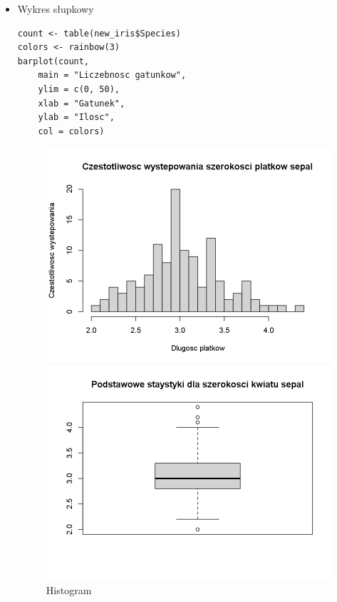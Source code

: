 \documentclass[11pt]{article}
\begin{document}
\begin{enumerate}
\begin{itemize}
        	\item Wykres słupkowy
        	\begin{verbatim}
count <- table(new_iris$Species)
colors <- rainbow(3)
barplot(count,
	main = "Liczebnosc gatunkow",
	ylim = c(0, 50),
	xlab = "Gatunek",
	ylab = "Ilosc",
	col = colors)
        	\end{verbatim}
        	
        	\begin{figure}[H]
        		\begin{minipage}{.5\textwidth}
        			\centering
        			\includegraphics[width=\textwidth]{imgs/hist}
        			\caption{Histogram}
        		\end{minipage}
        		\begin{minipage}{.5\textwidth}
        			\centering
        			\includegraphics[width=\textwidth]{imgs/box}

\end{minipage}
\end{figure}
\end{itemize}
\end{enumerate}
\end{document}
